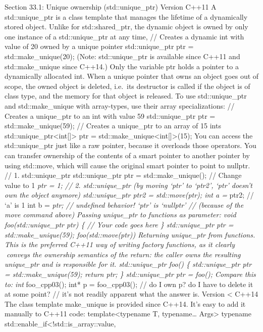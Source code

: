 Section 33.1: Unique ownership (std::unique\_ptr) Version C++11 A
std::unique\_ptr is a class template that manages the lifetime of a
dynamically stored object. Unlike for std::shared\_ptr, the dynamic
object is owned by only one instance of a std::unique\_ptr at any time,
// Creates a dynamic int with value of 20 owned by a unique pointer
std::unique\_ptr ptr = std::make\_unique(20); (Note: std::unique\_ptr is
available since C++11 and std::make\_unique since C++14.) Only the
variable ptr holds a pointer to a dynamically allocated int. When a
unique pointer that owns an object goes out of scope, the owned object
is deleted, i.e.~its destructor is called if the object is of class
type, and the memory for that object is released. To use
std::unique\_ptr and std::make\_unique with array-types, use their array
specializations: // Creates a unique\_ptr to an int with value 59
std::unique\_ptr ptr = std::make\_unique(59); // Creates a unique\_ptr
to an array of 15 ints std::unique\_ptr\textless int{[}{]}\textgreater{}
ptr = std::make\_unique\textless int{[}{]}\textgreater(15); You can
access the std::unique\_ptr just like a raw pointer, because it
overloads those operators. You can transfer ownership of the contents of
a smart pointer to another pointer by using std::move, which will cause
the original smart pointer to point to nullptr. // 1. std::unique\_ptr
std::unique\_ptr ptr = std::make\_unique(); // Change value to 1
\emph{ptr = 1; // 2. std::unique\_ptr (by moving `ptr' to `ptr2', `ptr'
doesn't own the object anymore) std::unique\_ptr ptr2 = std::move(ptr);
int a = }ptr2; // `a' is 1 int b = \emph{ptr; // undefined behavior!
`ptr' is `nullptr' // (because of the move command above) Passing
unique\_ptr to functions as parameter: void foo(std::unique\_ptr ptr) \{
// Your code goes here \} std::unique\_ptr ptr = std::make\_unique(59);
foo(std::move(ptr)) Returning unique\_ptr from functions. This is the
preferred C++11 way of writing factory functions, as it clearly conveys
the ownership semantics of the return: the caller owns the resulting
unique\_ptr and is responsible for it. std::unique\_ptr foo() \{
std::unique\_ptr ptr = std::make\_unique(59); return ptr; \}
std::unique\_ptr ptr = foo(); Compare this to: int} foo\_cpp03(); int* p
= foo\_cpp03(); // do I own p? do I have to delete it at some point? //
it's not readily apparent what the answer is. Version \textless{} C++14
The class template make\_unique is provided since C++14. It's easy to
add it manually to C++11 code: template\textless typename T,
typename\ldots{} Args\textgreater{} typename
std::enable\_if\textless!std::is\_array::value,
